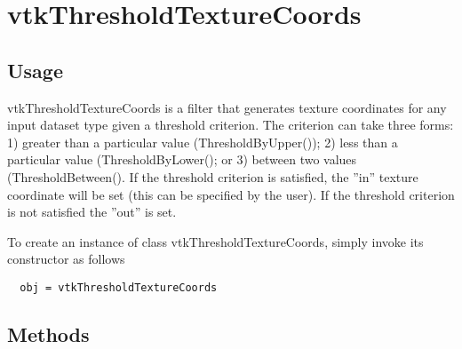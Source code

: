 \section{vtkThresholdTextureCoords}

\subsection{Usage}

 vtkThresholdTextureCoords is a filter that generates texture coordinates for
 any input dataset type given a threshold criterion. The criterion can take 
 three forms: 1) greater than a particular value (ThresholdByUpper()); 
 2) less than a particular value (ThresholdByLower(); or 3) between two 
 values (ThresholdBetween(). If the threshold criterion is satisfied, 
 the ''in'' texture coordinate will be set (this can be specified by the
 user). If the threshold criterion is not satisfied the ''out'' is set.

To create an instance of class vtkThresholdTextureCoords, simply
invoke its constructor as follows
\begin{verbatim}
  obj = vtkThresholdTextureCoords
\end{verbatim}
\subsection{Methods}

